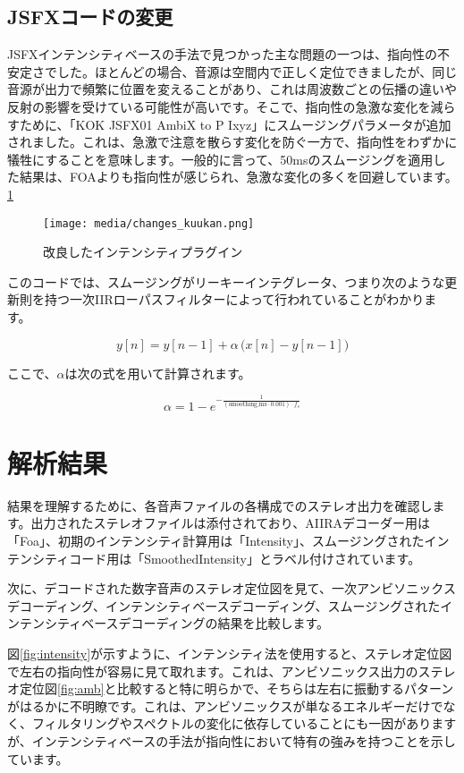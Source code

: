 \documentclass[a4paper, 12pt]{article}
\begin{document}
\subsection{JSFXコードの変更}

JSFXインテンシティベースの手法で見つかった主な問題の一つは、指向性の不安定さでした。ほとんどの場合、音源は空間内で正しく定位できましたが、同じ音源が出力で頻繁に位置を変えることがあり、これは周波数ごとの伝播の違いや反射の影響を受けている可能性が高いです。そこで、指向性の急激な変化を減らすために、「KOK JSFX01 AmbiX to P Ixyz」にスムージングパラメータが追加されました。これは、急激で注意を散らす変化を防ぐ一方で、指向性をわずかに犠牲にすることを意味します。一般的に言って、50msのスムージングを適用した結果は、FOAよりも指向性が感じられ、急激な変化の多くを回避しています。\ref{fig:newCode}

\begin{figure}
    \centering
    \texttt{[image: media/changes\_kuukan.png]}
    \caption{改良したインテンシティプラグイン}
    \label{fig:newCode}
\end{figure}

このコードでは、スムージングがリーキーインテグレータ、つまり次のような更新則を持つ一次IIRローパスフィルターによって行われていることがわかります。

\[y[n]=y[n-1]+\alpha\,\big(x[n]-y[n-1]\big)\]

ここで、$\alpha$は次の式を用いて計算されます。

\[\alpha=1-e^{-\frac{1}{(\text{smoothing\_ms}\cdot0.001)\cdot f_s}}\]

\section{解析結果}

結果を理解するために、各音声ファイルの各構成でのステレオ出力を確認します。出力されたステレオファイルは添付されており、AIIRAデコーダー用は「Foa」、初期のインテンシティ計算用は「Intensity」、スムージングされたインテンシティコード用は「SmoothedIntensity」とラベル付けされています。

次に、デコードされた数字音声のステレオ定位図を見て、一次アンビソニックスデコーディング、インテンシティベースデコーディング、スムージングされたインテンシティベースデコーディングの結果を比較します。

図\ref{fig:intensity}が示すように、インテンシティ法を使用すると、ステレオ定位図で左右の指向性が容易に見て取れます。これは、アンビソニックス出力のステレオ定位図\ref{fig:amb}と比較すると特に明らかで、そちらは左右に振動するパターンがはるかに不明瞭です。これは、アンビソニックスが単なるエネルギーだけでなく、フィルタリングやスペクトルの変化に依存していることにも一因がありますが、インテンシティベースの手法が指向性において特有の強みを持つことを示しています。
\end{document}
